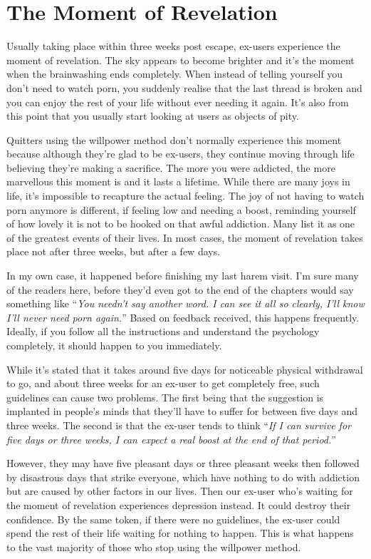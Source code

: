 \documentclass[
]{book}
\begin{document}
\hypertarget{the-moment-of-revelation}{%
\chapter{The Moment of Revelation}\label{the-moment-of-revelation}}

Usually taking place within three weeks post escape, ex-users experience the moment of revelation. The sky appears to become brighter and it's the moment when the brainwashing ends completely. When instead of telling yourself you don't need to watch porn, you suddenly realise that the last thread is broken and you can enjoy the rest of your life without ever needing it again. It's also from this point that you usually start looking at users as objects of pity.

Quitters using the willpower method don't normally experience this moment because although they're glad to be ex-users, they continue moving through life believing they're making a sacrifice. The more you were addicted, the more marvellous this moment is and it lasts a lifetime. While there are many joys in life, it's impossible to recapture the actual feeling. The joy of not having to watch porn anymore is different, if feeling low and needing a boost, reminding yourself of how lovely it is not to be hooked on that awful addiction. Many list it as one of the greatest events of their lives. In most cases, the moment of revelation takes place not after three weeks, but after a few days.

In my own case, it happened before finishing my last harem visit. I'm sure many of the readers here, before they'd even got to the end of the chapters would say something like ``\emph{You needn't say another word. I can see it all so clearly, I'll know I'll never need porn again.}'' Based on feedback received, this happens frequently. Ideally, if you follow all the instructions and understand the psychology completely, it should happen to you immediately.

While it's stated that it takes around five days for noticeable physical withdrawal to go, and about three weeks for an ex-user to get completely free, such guidelines can cause two problems. The first being that the suggestion is implanted in people's minds that they'll have to suffer for between five days and three weeks. The second is that the ex-user tends to think ``\emph{If I can survive for five days or three weeks, I can expect a real boost at the end of that period.}''

However, they may have five pleasant days or three pleasant weeks then followed by disastrous days that strike everyone, which have nothing to do with addiction but are caused by other factors in our lives. Then our ex-user who's waiting for the moment of revelation experiences depression instead. It could destroy their confidence. By the same token, if there were no guidelines, the ex-user could spend the rest of their life waiting for nothing to happen. This is what happens to the vast majority of those who stop using the willpower method.
\end{document}
